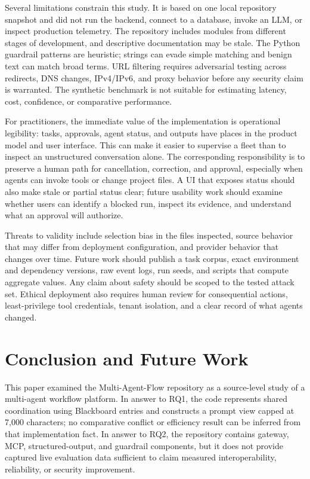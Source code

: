 \documentclass[12pt,onecolumn,draftclsnofoot]{IEEEtran}
\begin{document}
Several limitations constrain this study. It is based on one local repository snapshot and did not run the backend, connect to a database, invoke an LLM, or inspect production telemetry. The repository includes modules from different stages of development, and descriptive documentation may be stale. The Python guardrail patterns are heuristic; strings can evade simple matching and benign text can match broad terms. URL filtering requires adversarial testing across redirects, DNS changes, IPv4/IPv6, and proxy behavior before any security claim is warranted. The synthetic benchmark is not suitable for estimating latency, cost, confidence, or comparative performance.

For practitioners, the immediate value of the implementation is operational legibility: tasks, approvals, agent status, and outputs have places in the product model and user interface. This can make it easier to supervise a fleet than to inspect an unstructured conversation alone. The corresponding responsibility is to preserve a human path for cancellation, correction, and approval, especially when agents can invoke tools or change project files. A UI that exposes status should also make stale or partial status clear; future usability work should examine whether users can identify a blocked run, inspect its evidence, and understand what an approval will authorize.

Threats to validity include selection bias in the files inspected, source behavior that may differ from deployment configuration, and provider behavior that changes over time. Future work should publish a task corpus, exact environment and dependency versions, raw event logs, run seeds, and scripts that compute aggregate values. Any claim about safety should be scoped to the tested attack set. Ethical deployment also requires human review for consequential actions, least-privilege tool credentials, tenant isolation, and a clear record of what agents changed.

\section{Conclusion and Future Work}
This paper examined the Multi-Agent-Flow repository as a source-level study of a multi-agent workflow platform. In answer to RQ1, the code represents shared coordination using Blackboard entries and constructs a prompt view capped at 7,000 characters; no comparative conflict or efficiency result can be inferred from that implementation fact. In answer to RQ2, the repository contains gateway, MCP, structured-output, and guardrail components, but it does not provide captured live evaluation data sufficient to claim measured interoperability, reliability, or security improvement.
\end{document}
